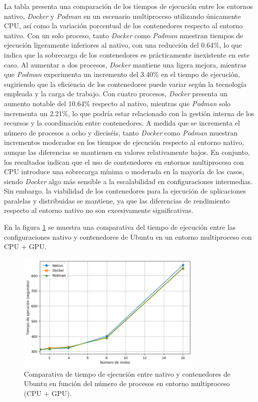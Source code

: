 La tabla presenta una comparación de los tiempos de ejecución entre los entornos nativo, \textit{Docker} y \textit{Podman} en un escenario multiproceso utilizando únicamente CPU, así como la variación porcentual de los contenedores respecto al entorno nativo. Con un solo proceso, tanto \textit{Docker} como \textit{Podman} muestran tiempos de ejecución ligeramente inferiores al nativo, con una reducción del 0.64\%, lo que indica que la sobrecarga de los contenedores es prácticamente inexistente en este caso. Al aumentar a dos procesos, \textit{Docker} mantiene una ligera mejora, mientras que \textit{Podman} experimenta un incremento del 3.40\% en el tiempo de ejecución, sugiriendo que la eficiencia de los contenedores puede variar según la tecnología empleada y la carga de trabajo. Con cuatro procesos, \textit{Docker} presenta un aumento notable del 10.64\% respecto al nativo, mientras que \textit{Podman} solo incrementa un 2.21\%, lo que podría estar relacionado con la gestión interna de los recursos y la coordinación entre contenedores. A medida que se incrementa el número de procesos a ocho y dieciséis, tanto \textit{Docker} como \textit{Podman} muestran incrementos moderados en los tiempos de ejecución respecto al entorno nativo, aunque las diferencias se mantienen en valores relativamente bajos. En conjunto, los resultados indican que el uso de contenedores en entornos multiproceso con CPU introduce una sobrecarga mínima o moderada en la mayoría de los casos, siendo \textit{Docker} algo más sensible a la escalabilidad en configuraciones intermedias. Sin embargo, la viabilidad de los contenedores para la ejecución de aplicaciones paralelas y distribuidas se mantiene, ya que las diferencias de rendimiento respecto al entorno nativo no son excesivamente significativas.

En la figura \ref{fig:multi-node_ubuntu_container_vs_native_gpu_time} se muestra una comparativa del tiempo de ejecución entre las configuraciones nativo y contenedores de Ubuntu en un entorno multiproceso con CPU + GPU.

\begin{figure}[H]
    \centering
    \includegraphics[width=0.8\textwidth]{imagenes/cap5/multi-node_ubuntu_container_vs_native_gpu_time.png}
    \caption{Comparativa de tiempo de ejecución entre nativo y contenedores de Ubuntu en función del número de procesos en entorno multiproceso (CPU + GPU).}
    \label{fig:multi-node_ubuntu_container_vs_native_gpu_time}
\end{figure}

